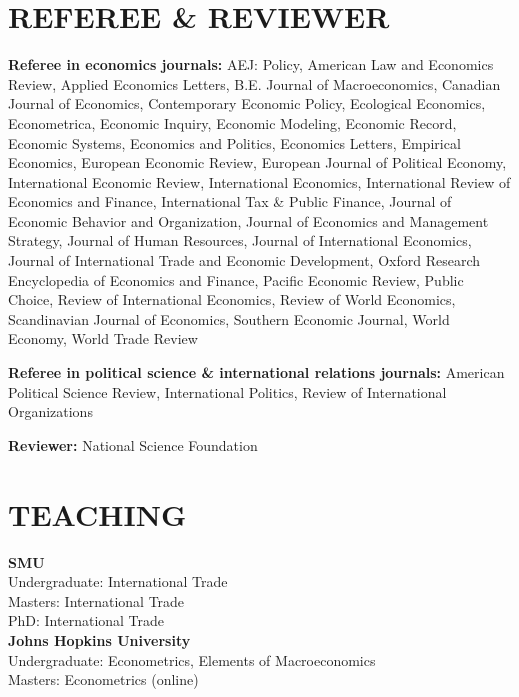 \documentclass[11pt]{res}
\begin{document}
\begin{resume}
\section{REFEREE \& REVIEWER} \vspace{1.5mm}
{\bf Referee in economics journals:} AEJ: Policy, American Law and Economics Review, Applied Economics Letters, B.E. Journal of Macroeconomics, Canadian Journal of Economics, Contemporary Economic Policy, Ecological Economics, Econometrica, Economic Inquiry, Economic Modeling, Economic Record, Economic Systems, Economics and Politics, Economics Letters, Empirical Economics, European Economic Review, European Journal of Political Economy, International Economic Review, International Economics, International Review of Economics and Finance, International Tax \& Public Finance, Journal of Economic Behavior and Organization, Journal of Economics and Management Strategy, Journal of Human Resources, Journal of International Economics, Journal of International Trade and Economic Development, Oxford Research Encyclopedia of Economics and Finance, Pacific Economic Review, Public Choice, Review of International Economics, Review of World Economics, Scandinavian Journal of Economics, Southern Economic Journal, World Economy, World Trade Review

{\bf Referee in political science \& international relations journals:} American Political Science Review, International Politics, Review of International Organizations

{\bf Reviewer:} National Science Foundation

\section{TEACHING} \vspace{1.5mm}
\textbf{SMU}\vspace{1.5mm}\\
Undergraduate: International Trade\vspace{1.5mm}\\
Masters: International Trade\vspace{1.5mm}\\
PhD: International Trade\vspace{4mm}\\
\textbf{Johns Hopkins University}\vspace{1.5mm}\\
Undergraduate: Econometrics, Elements of Macroeconomics\vspace{1.5mm}\\
Masters: Econometrics (online)


\end{resume}
\end{document}
